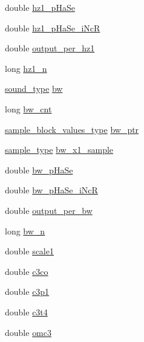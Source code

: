 \begin{DoxyCompactItemize}
\item 
double \hyperlink{structaresonvv__susp__struct_a3cd10d6e665bfd3c4ff8ef9eb6add932}{hz1\+\_\+p\+Ha\+Se}
\item 
double \hyperlink{structaresonvv__susp__struct_a75d5e45675589c23ae429a01595ec1ba}{hz1\+\_\+p\+Ha\+Se\+\_\+i\+NcR}
\item 
double \hyperlink{structaresonvv__susp__struct_a399660bfcd5f2a9791220eaafbd207d3}{output\+\_\+per\+\_\+hz1}
\item 
long \hyperlink{structaresonvv__susp__struct_a2bf91612d7ae29a5d3fefd596273f05b}{hz1\+\_\+n}
\item 
\hyperlink{sound_8h_a792cec4ed9d6d636d342d9365ba265ea}{sound\+\_\+type} \hyperlink{structaresonvv__susp__struct_a3852375a1f4b1e49598b251417b1f48f}{bw}
\item 
long \hyperlink{structaresonvv__susp__struct_a719adcd72f244baac0b48586ca8cc4f2}{bw\+\_\+cnt}
\item 
\hyperlink{sound_8h_a83d17f7b465d1591f27cd28fc5eb8a03}{sample\+\_\+block\+\_\+values\+\_\+type} \hyperlink{structaresonvv__susp__struct_a78140da1b7a52e34a5c64a9fbc08ec10}{bw\+\_\+ptr}
\item 
\hyperlink{sound_8h_a3a9d1d4a1c153390d2401a6e9f71b32c}{sample\+\_\+type} \hyperlink{structaresonvv__susp__struct_a219946626ef5deb6dda6299432a15638}{bw\+\_\+x1\+\_\+sample}
\item 
double \hyperlink{structaresonvv__susp__struct_add509c299a6723b3843185d45b350620}{bw\+\_\+p\+Ha\+Se}
\item 
double \hyperlink{structaresonvv__susp__struct_a2d630cb7d2269b4f8887fde0e53bce62}{bw\+\_\+p\+Ha\+Se\+\_\+i\+NcR}
\item 
double \hyperlink{structaresonvv__susp__struct_a54f98c045322111ab099d7b679a95d5f}{output\+\_\+per\+\_\+bw}
\item 
long \hyperlink{structaresonvv__susp__struct_a1b1fcb0927ce18cb5ed6d5068d010ea3}{bw\+\_\+n}
\item 
double \hyperlink{structaresonvv__susp__struct_a2d3ba0f59b8eb569b348f6e296b9f1c3}{scale1}
\item 
double \hyperlink{structaresonvv__susp__struct_ac4be464876e9eb7b5d3ce783bd1ec941}{c3co}
\item 
double \hyperlink{structaresonvv__susp__struct_a7dbf85e6819fdac1fc9d1bcda59b29e9}{c3p1}
\item 
double \hyperlink{structaresonvv__susp__struct_a9f13f4a5fc5dce4ed679f511ec9baba9}{c3t4}
\item 
double \hyperlink{structaresonvv__susp__struct_a5701f314cd9bccf2daa999d055b73a1c}{omc3}

\end{DoxyCompactItemize}
